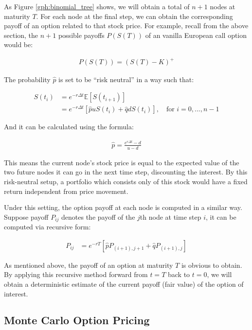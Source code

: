 As Figure \ref{gph:binomial_tree} shows, we will obtain a total of $n+1$ nodes at maturity $T$. For each node at the final step, we can obtain the corresponding payoff of an option related to that stock price. For example, recall from the above section, the $n+1$ possible payoffs $P(S(T))$ of an vanilla European call option would be:

\begin{align}
P(S(T))=(S(T)-K)^+
\end{align}

The probability $\hat{p}$ is set to be ``risk neutral'' in a way such that:

\begin{align*}
S(t_{i}) &= e^{-r\Delta t}\mathbb{E}[S(t_{i+1})] \\
		 &= e^{-r\Delta t}[\hat{p}uS(t_i)+\hat{q}dS(t_i)],\quad\text{for }i=0,...,n-1
\end{align*}

And it can be calculated using the formula:

\begin{align} \label{eq:binomial_riskless_p}
\hat{p} = \frac{e^{r\Delta t}-d}{u-d}
\end{align}

This means the current node's stock price is equal to the expected value of the two future nodes it can go in the next time step, discounting the interest. By this risk-neutral setup, a portfolio which consists only of this stock would have a fixed return independent from price movement.

Under this setting, the option payoff at each node is computed in a similar way. Suppose payoff $P_{ij}$ denotes the payoff of the $j$th node at time step $i$, it can be computed via recursive form:

\begin{align} \label{eq:binomial_recursive}
P_{ij} &= e^{-rT}[\hat{p}P_{(i+1),j+1} + \hat{q}P_{(i+1),j}]
\end{align}

As mentioned above, the payoff of an option at maturity $T$ is obvious to obtain. By applying this recursive method forward from $t=T$ back to $t=0$, we will obtain a deterministic estimate of the current payoff (fair value) of the option of interest.

\subsection{Monte Carlo Option Pricing}

